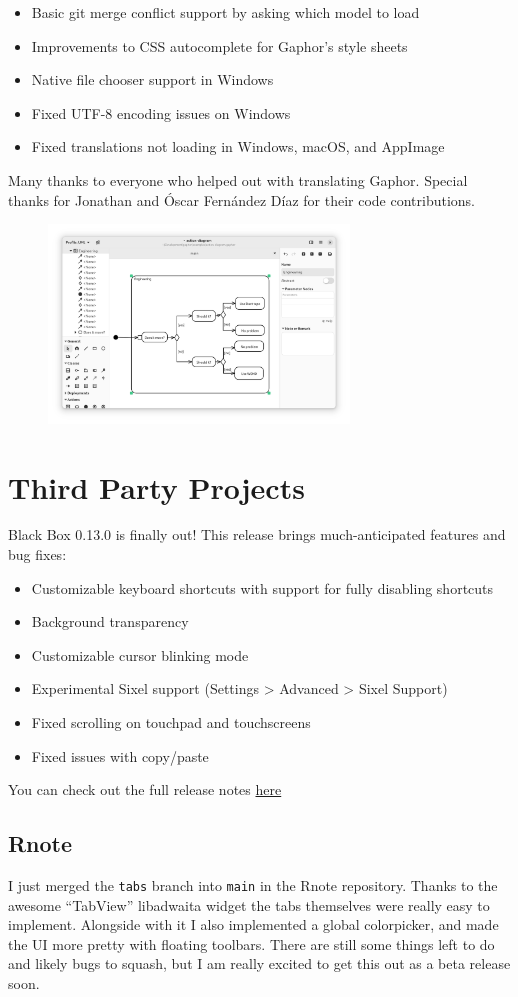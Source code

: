 \documentclass[a4paper,12pt]{report}
\begin{document}
\begin{itemize}
\item Basic git merge conflict support by asking which model to load
\item Improvements to CSS autocomplete for Gaphor’s style sheets
\item Native file chooser support in Windows
\item Fixed UTF-8 encoding issues on Windows
\item Fixed translations not loading in Windows, macOS, and AppImage
\end{itemize}
Many thanks to everyone who helped out with translating Gaphor. Special thanks for Jonathan and Óscar Fernández Díaz for their code contributions.
\begin{figure}[htp]
\centering
\includegraphics[width=8cm]{IKT_18_1_23@6.png}
\end{figure}
\section{Third Party Projects}
Black Box 0.13.0 is finally out! This release brings much-anticipated features and bug fixes:
\begin{itemize}
\item Customizable keyboard shortcuts with support for fully disabling shortcuts
\item Background transparency
\item Customizable cursor blinking mode
\item Experimental Sixel support (Settings > Advanced > Sixel Support)
\item Fixed scrolling on touchpad and touchscreens
\item Fixed issues with copy/paste
\end{itemize}
You can check out the full release notes \href{https://gitlab.gnome.org/raggesilver/blackbox/-/releases/v0.13.0}{here}


\subsection{Rnote}
I just merged the \verb|tabs| branch into \verb|main| in the Rnote repository. Thanks to the awesome “TabView” libadwaita widget the tabs themselves were really easy to implement. Alongside with it I also implemented a global colorpicker, and made the UI more pretty with floating toolbars. There are still some things left to do and likely bugs to squash, but I am really excited to get this out as a beta release soon.
\end{document}
